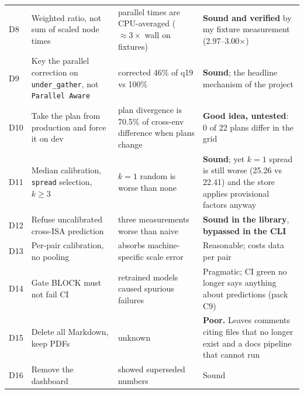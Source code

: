 \begin{center}
\begin{longtable}{@{}L{0.7cm}L{3.6cm}L{4.4cm}L{6.0cm}@{}}
D8 & Weighted ratio, not sum of scaled node times & parallel times are CPU-averaged ($\approx3\times$ wall on fixtures) & \textbf{Sound and verified} by my fixture measurement (2.97--3.00$\times$)\\
D9 & Key the parallel correction on \texttt{under\_gather}, not \texttt{Parallel Aware} & corrected 46\% of q19 vs 100\% & \textbf{Sound}; the headline mechanism of the project\\
D10 & Take the plan from production and force it on dev & plan divergence is 70.5\% of cross-env difference when plans change & \textbf{Good idea, untested}: 0 of 22 plans differ in the grid\\
D11 & Median calibration, \texttt{spread} selection, $k\ge3$ & $k=1$ random is worse than none & \textbf{Sound}; yet $k=1$ spread is still worse (25.26 vs 22.41) and the store applies provisional factors anyway\\
D12 & Refuse uncalibrated cross-ISA prediction & three measurements worse than naive & \textbf{Sound in the library}, \textbf{bypassed in the CLI}\\
D13 & Per-pair calibration, no pooling & absorbs machine-specific scale error & Reasonable; costs data per pair\\
D14 & Gate BLOCK must not fail CI & retrained models caused spurious failures & Pragmatic; CI green no longer says anything about predictions (pack C9)\\
D15 & Delete all Markdown, keep PDFs & unknown & \textbf{Poor.} Leaves comments citing files that no longer exist and a docs pipeline that cannot run\\
D16 & Remove the dashboard & showed superseded numbers & Sound\\
\bottomrule
\end{longtable}
\end{center}

